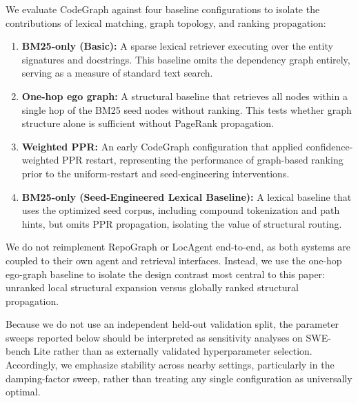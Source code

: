 We evaluate CodeGraph against four baseline configurations to isolate the contributions of lexical matching, graph topology, and ranking propagation:
\begin{enumerate}
    \item \textbf{BM25-only (Basic):} A sparse lexical retriever executing over the entity signatures and docstrings. This baseline omits the dependency graph entirely, serving as a measure of standard text search.
    \item \textbf{One-hop ego graph:} A structural baseline that retrieves all nodes within a single hop of the BM25 seed nodes without ranking. This tests whether graph structure alone is sufficient without PageRank propagation.
    \item \textbf{Weighted PPR:} An early CodeGraph configuration that applied confidence-weighted PPR restart, representing the performance of graph-based ranking prior to the uniform-restart and seed-engineering interventions.
    \item \textbf{BM25-only (Seed-Engineered Lexical Baseline):} A lexical baseline that uses the optimized seed corpus, including compound tokenization and path hints, but omits PPR propagation, isolating the value of structural routing.
\end{enumerate}

We do not reimplement RepoGraph or LocAgent end-to-end, as both systems are coupled to their own agent and retrieval interfaces. Instead, we use the one-hop ego-graph baseline to isolate the design contrast most central to this paper: unranked local structural expansion versus globally ranked structural propagation.

Because we do not use an independent held-out validation split, the parameter sweeps reported below should be interpreted as sensitivity analyses on SWE-bench Lite rather than as externally validated hyperparameter selection. Accordingly, we emphasize stability across nearby settings, particularly in the damping-factor sweep, rather than treating any single configuration as universally optimal.

